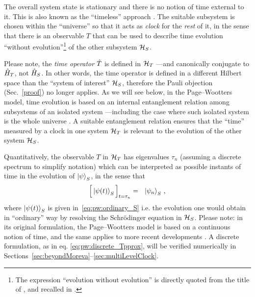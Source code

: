 The overall system state
is stationary and there is no notion
of time external to it.
This is also known as the
``timeless'' approach \parencite{Marletto:Evolution}.
\citereset
The suitable subsystem is chosen within the ``universe'' so that it acts as
\emph{clock} for the \emph{rest} of it, in the sense that
there is an observable $T$
that can be used to
describe time evolution ``without evolution''\footnote{
  The expression ``evolution without evolution''
  is directly quoted from the title of \cite{PageWootters},
  and recalled in \cite{Marletto:Evolution}.
}
of the other subsystem $\mathcal{H}_S$.

Please note,
the \emph{time operator} $\hat{T}$ is defined in $\mathcal{H}_T$ ---and canonically conjugate to $\hat{H}_T$, not $\hat{H}_S$.
In other words, the time operator is defined in a different Hilbert space than the ``system of interest'' $\mathcal{H}_S$,
therefore
the Pauli objection (Sec.~\ref{proof}) no longer applies. 
As we will see below, in the Page--Wootters model, time evolution is based on an internal entanglement
relation among subsystems of an isolated system
---including the case where such isolated system is the whole universe \parencite{PageWootters}.
A suitable entanglement relation ensures that 
the ``time'' measured by a clock in one system $\mathcal{H}_T$ is relevant to the evolution of the other
system $\mathcal{H}_S$.

Quantitatively,
the observable $T$ in $\mathcal{H}_T$
has eigenvalues $\tau_n$
(assuming a discrete spectrum to simplify notation)
which can be interpreted as possible
instants of time in the evolution of $\ket{\psi}_S$, in the sense that
\begin{equation}\label{eq:pw:discrete_Tpprox}
  \Big[ \ket{\psi(t)}_S \Big]_{t=\tau_n} = \,\,\,\, \ket{\psi_n}_S \, \text{,}
\end{equation}
where $\ket{\psi(t)}_S$ is given in~\eqref{eq:pw:ordinary_S} i.e.
the evolution one would obtain in ``ordinary'' way
by resolving the Schr\"{o}dinger equation in $\mathcal{H}_S$.
Please note:
in its original formulation, the Page--Wootters model is based on a continuous
notion of time, and the same applies to more recent developments \parencite{Lloyd:Time}.
A discrete formulation, as in eq. \eqref{eq:pw:discrete_Tpprox},
will be verified numerically in Sections~\ref{sec:beyondMoreva}--\ref{sec:multiLevelClock}.


